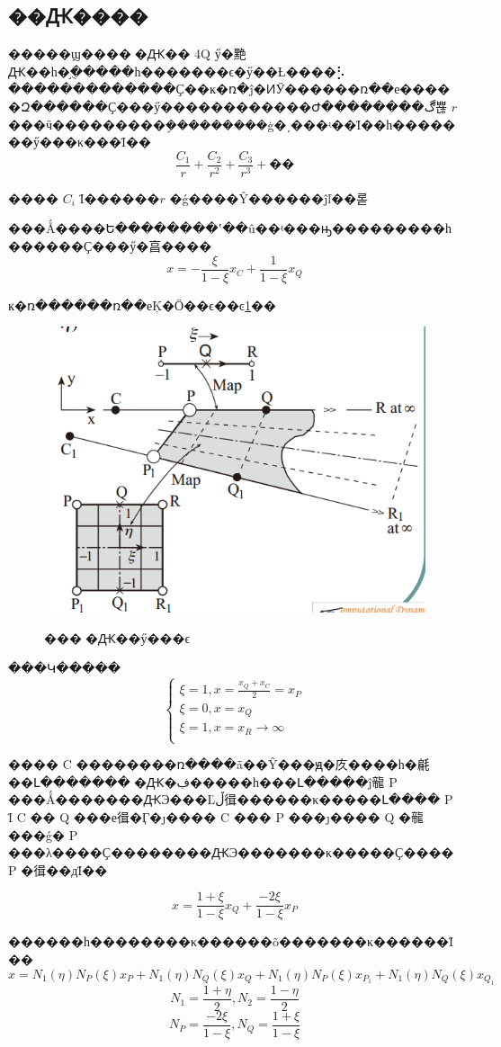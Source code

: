 \subsection{��Ԫ����}
    �����ϣ����޵�Ԫ�� 4Q ӳ�䵥Ԫ��һ�֣�ֻ����һ�������ϵ�ӳ��Ƚ����⡣
    �������������Ҫ��ĸ�ռ�ĵ�ͶӰ������ռ��е�����Զ������Ҫ���ӳ������������Ժ��������ڰ뾶 $r$ ���ӵ���������ܹ���������ģ�͵���ʵ��Ϊ��һ�������ӳ���κ���Ϊ��
    $$
    \frac{C_1}{r}+\frac{C_2}{r^2}+\frac{C_3}{r^3}+��
    $$

    ���� $C_i$ Ϊ������$r$ �ǵ����Ŷ������ĵľ��롣

    ���Ǻ����Ե��������ʽ��û��ʵ���ԣ���������һ������Ҫ���ӳ�亯����
    $$
    x=-\frac{\xi}{1-\xi}x_C+\frac{1}{1-\xi}x_Q
    $$

    ĸ�ռ������ռ��еĶ�Ӧ��ϵ��ͼ\ref{Infinite}��
    \begin{figure}[h]
        \centering
        \includegraphics[width=.6\textwidth]{./elements/fig/infinite.png}
        \label{Infinite}
        \caption{���޵�Ԫ��ӳ���ϵ}
    \end{figure}

    ���Կ�����
    $$
    \begin{cases}
        \xi =1,x=\frac{x_Q+x_C}{2}=x_P\\
        \xi =0,x=x_Q\\
        \xi =1,x=x_R\rightarrow \infty\\
    \end{cases}
    $$

    ���� C ��������ռ����ǡ��Ŷ���ԭ�㡱����һ�㲢��Լ�������޵�Ԫ�ڣ�����һ���Լ�����ĵ㡣 P ���Ǻ�������ԪЭ���Ľڵ㣬������κ�����Լ���� P Ϊ C �� Q ���е㣬�Ӷ�ȷ���� C ��� P ���ȷ���� Q �㡣
    ���ǵ� P ���λ����Ҫ��������ԪЭ�������κ�����Ҫ���� P �㣬��дΪ��

    $$
    x=\frac{1+\xi}{1-\xi}x_Q+\frac{-2\xi}{1-\xi}x_P
    $$

    ������һ��������κ������õ�������κ������Ϊ��
    $$
    x=N_1\left( \eta \right) N_P\left( \xi \right) x_P+N_1\left( \eta \right) N_Q\left( \xi \right) x_Q+N_1\left( \eta \right) N_P\left( \xi \right) x_{P_1}+N_1\left( \eta \right) N_Q\left( \xi \right) x_{Q_1}
    $$
    $$
    N_1=\frac{1+\eta}{2},N_2=\frac{1-\eta}{2}
    $$
    $$
    N_P=\frac{-2\xi}{1-\xi},N_Q=\frac{1+\xi}{1-\xi}
    $$

